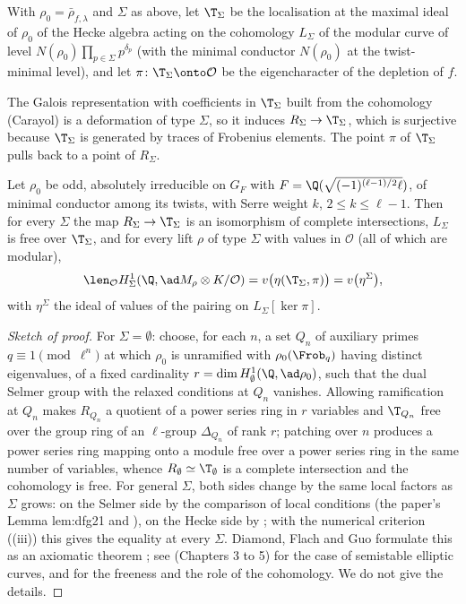\begin{definition}\label{def:congruence:hecke-side}
With $\rho_0=\bar\rho_{f,\lambda}$ and $\Sigma$ as above, let $\T_\Sigma$ be the localisation at the maximal ideal of $\rho_0$ of the Hecke algebra acting on the cohomology $L_\Sigma$ of the modular curve
of level $N(\rho_0)\prod_{p\in\Sigma}p^{\delta_p}$ (with the minimal conductor $N(\rho_0)$ at the twist-minimal level), and let $\pi\colon\T_\Sigma\onto\mathcal O$ be the eigencharacter of the depletion of $f$.
\end{definition}

The Galois representation with coefficients in $\T_\Sigma$ built from the cohomology (Carayol) is a deformation of type $\Sigma$, so it induces $R_\Sigma\to\T_\Sigma$, which is surjective because $\T_\Sigma$ is
generated by traces of Frobenius elements. The point $\pi$ of $\T_\Sigma$ pulls back to a point of $R_\Sigma$.

\begin{theorem}\label{thm:congruence:tw-axiomatic}
Let $\rho_0$ be odd, absolutely irreducible on $G_F$ with $F=\Q(\sqrt{(-1)^{(\ell-1)/2}\ell})$, of minimal conductor among its twists, with Serre weight $k$, $2\le k\le\ell-1$. Then for every $\Sigma$ the map
$R_\Sigma\to\T_\Sigma$ is an isomorphism of complete intersections, $L_\Sigma$ is free over $\T_\Sigma$, and for every lift $\rho$ of type $\Sigma$ with values in $\mathcal O$ (all of which are modular),
\[
\len_{\mathcal O}H^1_\Sigma(\Q,\ad M_\rho\otimes K/\mathcal O)=v\bigl(\eta(\T_\Sigma,\pi)\bigr)=v\bigl(\eta^\Sigma\bigr),
\]
with $\eta^\Sigma$ the ideal of values of the pairing on $L_\Sigma[\ker\pi]$.
\end{theorem}

\begin{proof}[Sketch of proof]
For $\Sigma=\emptyset$: choose, for each $n$, a set $Q_n$ of auxiliary primes $q\equiv1\pmod{\ell^n}$ at which $\rho_0$ is unramified with $\rho_0(\Frob_q)$ having distinct eigenvalues, of a fixed
cardinality $r=\dim H^1_\emptyset(\Q,\ad\rho_0)$, such that the dual Selmer group with the relaxed conditions at $Q_n$ vanishes. Allowing ramification at $Q_n$ makes $R_{Q_n}$ a quotient of a
power series ring in $r$ variables and $\T_{Q_n}$ free over the group ring of an $\ell$-group $\Delta_{Q_n}$ of rank $r$; patching over $n$ produces a power series ring mapping onto a module free
over a power series ring in the same number of variables, whence $R_\emptyset\simeq\T_\emptyset$ is a complete intersection and the cohomology is free. For general $\Sigma$, both sides change by
the same local factors as $\Sigma$ grows: on the Selmer side by the comparison of local conditions (the paper's Lemma lem:dfg21 and ), on the Hecke side by
; with the numerical criterion ((iii)) this gives the equality at every $\Sigma$. Diamond, Flach and Guo formulate this
as an axiomatic theorem \cite[Section 3]{DFG04}; see \cite{DDT} (Chapters 3 to 5) for the case of semistable elliptic curves, and \cite{Diamond96} for the freeness and the role of the
cohomology. We do not give the details.
\end{proof}

